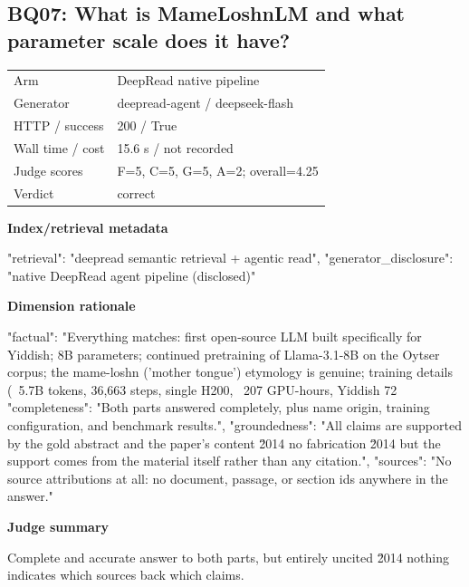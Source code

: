 \documentclass[10pt]{article}
\begin{document}
\subsection{BQ07: What is MameLoshnLM and what parameter scale does it have?}
\begin{tabular}{@{}ll@{}}
Arm & DeepRead native pipeline\\
Generator & deepread-agent / deepseek-flash\\
HTTP / success & 200 / True\\
Wall time / cost & 15.6 s / not recorded\\
Judge scores & F=5, C=5, G=5, A=2; overall=4.25\\
Verdict & correct\\
\end{tabular}

\textbf{Index/retrieval metadata}
\begin{EvidenceText}
{
  "retrieval": "deepread semantic retrieval + agentic read",
  "generator_disclosure": "native DeepRead agent pipeline (disclosed)"
}
\end{EvidenceText}

\textbf{Dimension rationale}
\begin{EvidenceText}
{
  "factual": "Everything matches: first open-source LLM built specifically for Yiddish; 8B parameters; continued pretraining of Llama-3.1-8B on the Oytser corpus; the mame-loshn ('mother tongue') etymology is genuine; training details (~5.7B tokens, 36,663 steps, single H200, ~207 GPU-hours, Yiddish 72%
  "completeness": "Both parts answered completely, plus name origin, training configuration, and benchmark results.",
  "groundedness": "All claims are supported by the gold abstract and the paper's content \u2014 no fabrication \u2014 but the support comes from the material itself rather than any citation.",
  "sources": "No source attributions at all: no document, passage, or section ids anywhere in the answer."
}
\end{EvidenceText}

\textbf{Judge summary}
\begin{EvidenceText}
Complete and accurate answer to both parts, but entirely uncited \u2014 nothing indicates which sources back which claims.
\end{EvidenceText}
\end{document}
